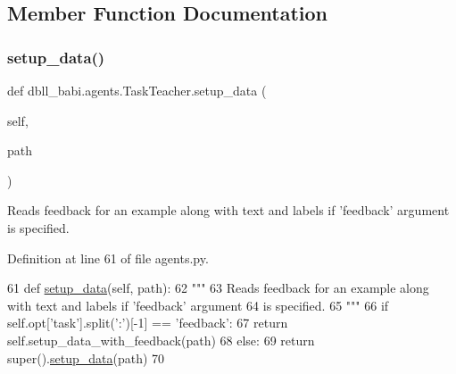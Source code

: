 \subsection{Member Function Documentation}
\mbox{\label{classdbll__babi_1_1agents_1_1TaskTeacher_adcbc1c54716e7b631e4a496f59df1f33}} 
\subsubsection{\texorpdfstring{setup\+\_\+data()}{setup\_data()}}
{\footnotesize\ttfamily def dbll\+\_\+babi.\+agents.\+Task\+Teacher.\+setup\+\_\+data (\begin{DoxyParamCaption}\item[{}]{self,  }\item[{}]{path }\end{DoxyParamCaption})}

\begin{DoxyVerb}Reads feedback for an example along with text and labels if 'feedback' argument
is specified.
\end{DoxyVerb}
 

Definition at line 61 of file agents.\+py.


\begin{DoxyCode}
61     \textcolor{keyword}{def }\hyperlink{namespaceparlai_1_1tasks_1_1multinli_1_1agents_a4fa2cb0ba1ed745336ad8bceed36b841}{setup\_data}(self, path):
62         \textcolor{stringliteral}{"""}
63 \textcolor{stringliteral}{        Reads feedback for an example along with text and labels if 'feedback' argument}
64 \textcolor{stringliteral}{        is specified.}
65 \textcolor{stringliteral}{        """}
66         \textcolor{keywordflow}{if} self.opt[\textcolor{stringliteral}{'task'}].split(\textcolor{stringliteral}{':'})[-1] == \textcolor{stringliteral}{'feedback'}:
67             \textcolor{keywordflow}{return} self.setup\_data\_with\_feedback(path)
68         \textcolor{keywordflow}{else}:
69             \textcolor{keywordflow}{return} super().\hyperlink{namespaceparlai_1_1tasks_1_1multinli_1_1agents_a4fa2cb0ba1ed745336ad8bceed36b841}{setup\_data}(path)
70 
\end{DoxyCode}
\mbox{\label{classdbll__babi_1_1agents_1_1TaskTeacher_a3275c0a4a11a3f5e723259d487db03f8}} 
